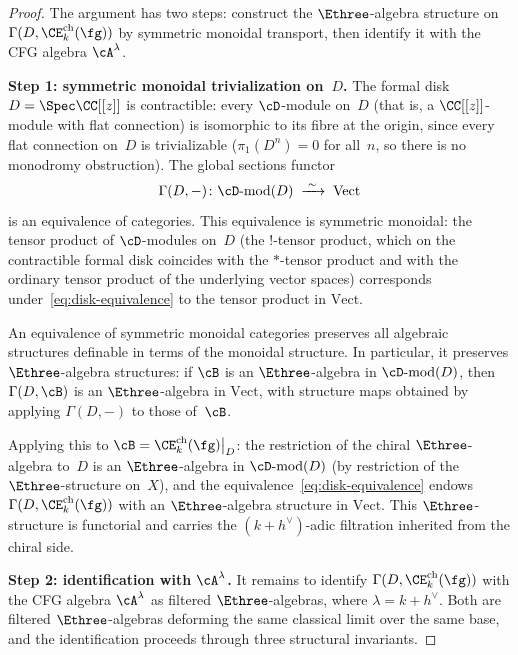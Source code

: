 \begin{proof}
The argument has two steps: construct the $\Ethree$-algebra
structure on $\Gamma(D, \CE^{\mathrm{ch}}_k(\fg))$
by symmetric monoidal transport, then identify it with the
CFG algebra $\cA^\lambda$.

\smallskip
\noindent\textbf{Step 1: symmetric monoidal trivialization
on~$D$.}
The formal disk $D = \Spec \CC[[z]]$ is contractible:
every $\cD$-module on~$D$ (that is, a $\CC[[z]]$-module
with flat connection) is isomorphic to its fibre at the
origin, since every flat connection on~$D$ is
trivializable ($\pi_1(D^n) = 0$ for all~$n$, so there is
no monodromy obstruction). The global sections functor
\begin{equation}\label{eq:disk-equivalence}
  \Gamma(D, -) \colon
  \cD\textrm{-}\mathrm{mod}(D) \;\xrightarrow{\;\sim\;}\;
  \mathrm{Vect}
\end{equation}
is an equivalence of categories. This equivalence is
symmetric monoidal: the tensor product of $\cD$-modules
on~$D$ (the $!$-tensor product, which on the contractible
formal disk coincides with the $*$-tensor product and with
the ordinary tensor product of the underlying vector
spaces) corresponds under~\eqref{eq:disk-equivalence} to
the tensor product in $\mathrm{Vect}$.

An equivalence of symmetric monoidal categories preserves
all algebraic structures definable in terms of the monoidal
structure. In particular, it preserves $\Ethree$-algebra
structures: if $\cB$ is an $\Ethree$-algebra in
$\cD\textrm{-}\mathrm{mod}(D)$, then
$\Gamma(D, \cB)$ is an $\Ethree$-algebra in
$\mathrm{Vect}$, with structure maps obtained by applying
$\Gamma(D, -)$ to those of~$\cB$.

Applying this to
$\cB = \CE^{\mathrm{ch}}_k(\fg)\big|_D$: the
restriction of the chiral $\Ethree$-algebra to~$D$ is an
$\Ethree$-algebra in $\cD\textrm{-}\mathrm{mod}(D)$ (by
restriction of the $\Ethree$-structure on~$X$), and the
equivalence~\eqref{eq:disk-equivalence} endows
$\Gamma(D, \CE^{\mathrm{ch}}_k(\fg))$ with an
$\Ethree$-algebra structure in $\mathrm{Vect}$. This
$\Ethree$-structure is functorial and carries the
$(k+h^\vee)$-adic filtration inherited from the chiral side.

\smallskip
\noindent\textbf{Step 2: identification with $\cA^\lambda$.}
It remains to identify
$\Gamma(D, \CE^{\mathrm{ch}}_k(\fg))$ with the CFG
algebra $\cA^\lambda$ as filtered $\Ethree$-algebras,
where $\lambda = k + h^\vee$. Both are filtered
$\Ethree$-algebras deforming the same classical limit over
the same base, and the identification proceeds through
three structural invariants.


\end{proof}
